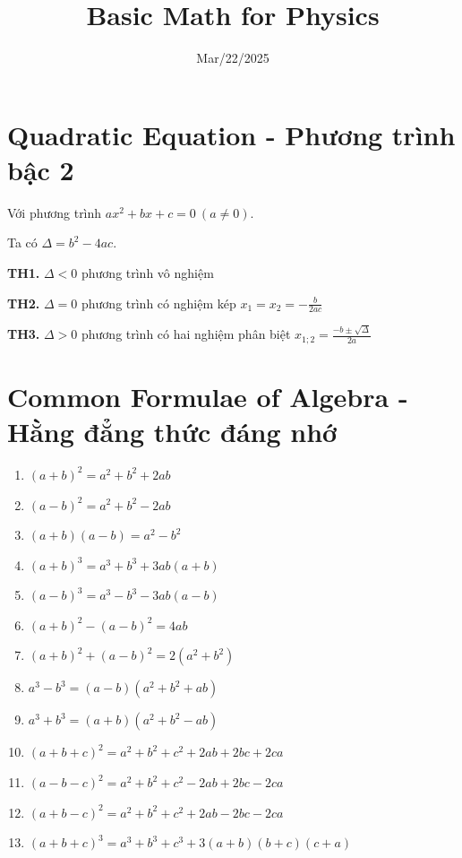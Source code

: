 \documentclass{article}
\begin{document}
\author{}
\title{Basic Math for Physics}
\date{Mar/22/2025}

\maketitle
\tableofcontents
\newpage

\section{Quadratic Equation - Phương trình bậc 2}

Với phương trình $ax^2 + bx + c = 0 \ (a \neq 0)$. \par

Ta có $\Delta = b^2 - 4ac$. \par

\textbf{TH1.} $\Delta < 0$ phương trình vô nghiệm \par

\textbf{TH2.} $\Delta = 0$ phương trình có nghiệm kép $x_1 = x_2 = -\frac{b}{2ac}$ \par

\textbf{TH3.} $\Delta > 0$ phương trình có hai nghiệm phân biệt $x_{1;2} = \frac{-b\pm \sqrt{\Delta}}{2a}$

\section{Common Formulae of Algebra - Hằng đẳng thức đáng nhớ}
\begin{enumerate}[label=(\roman*)]
	\item $(a+b)^2 = a^2 + b^2 + 2ab$
	\item $(a-b)^2 = a^2 + b^2 - 2ab$
	\item $(a+b)(a-b) = a^2 - b^2$
	\item $(a+b)^3 = a^3 + b^3 + 3ab(a+b)$
	\item $(a-b)^3 = a^3 - b^3 - 3ab(a-b)$
	\item $(a+b)^2 - (a-b)^2 = 4ab$
	\item $(a+b)^2 + (a-b)^2 = 2(a^2 + b^2)$
	\item $a^3 - b^3 = (a-b)(a^2 + b^2 + ab)$
	\item $a^3 + b^3 = (a+b)(a^2 + b^2 - ab)$

	\item $(a+b+c)^2 = a^2 + b^2 + c^2 + 2ab + 2bc + 2ca$
	\item $(a-b-c)^2 = a^2 + b^2 + c^2 - 2ab + 2bc - 2ca$
	\item $(a+b-c)^2 = a^2 + b^2 + c^2 + 2ab - 2bc - 2ca$
	\item $(a+b+c)^3 = a^3 + b^3 + c^3 + 3(a+b)(b+c)(c+a)$
\end{enumerate}
\end{document}

